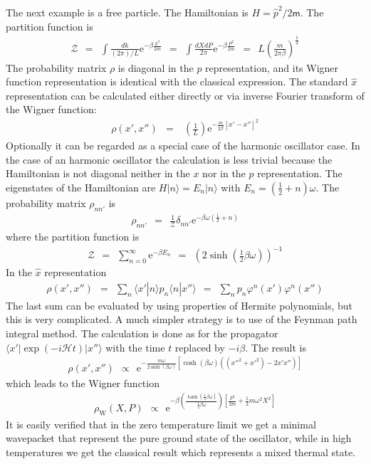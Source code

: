 \documentclass[onecolumn,fleqn]{revtex4}
\newcommand{\eexp}{\mathrm{e}^}
\newcommand{\mass}{\mathsf{m}}
\newcommand{\tbox}[1]{\text{#1}}
\newcommand{\beq}{\begin{eqnarray}}
\newcommand{\eeq}{\end{eqnarray}}
\begin{document}
The next example is a free particle.
The Hamiltonian is $H = \hat{p}^2/2\mass$. 
The partition function is  
\beq
\mathcal{Z} 
\ \ = \ \ \int \frac{dk}{(2\pi)/L} \eexp{-\beta \frac{k^2}{2m}} 
\ \ = \ \ \int \frac{dXdP}{2 \pi} \eexp{-\beta \frac{P^2}{2m}} 
\ \ = \ \ L \left( \frac{m}{2 \pi \beta} \right)^{\frac{1}{2}} 
\eeq
The probability matrix  $\rho$ is diagonal in the $p$ 
representation, and its Wigner function representation 
is identical with the classical expression. 
The standard $\hat{x}$ representation can be calculated either 
directly or via inverse Fourier transform of the Wigner function:
\beq
\rho (x',x'') & = & \ \left( \frac{1}{L} \right)  \eexp{-\frac{m}{2 \beta }[x'-x'']^2}
\eeq
Optionally it can be regarded as a special case of 
the harmonic oscillator case. In the case of an 
harmonic oscillator the calculation is 
less trivial because the Hamiltonian is not diagonal neither 
in the $x$ nor in the $p$ representation. 
The eigenstates of the Hamiltonian are $H |n\rangle = E_n |n\rangle$ 
with $E_n = \left( \frac{1}{2} + n \right) \omega$. 
The probability matrix $\rho_{nn'}$ is 
\beq
\rho_{nn'} \ \ = \ \ \frac{1}{\mathcal{Z}} \delta_{nn'} 
\eexp{-\beta \omega \left( \frac{1}{2} + n \right) } \eeq
where the partition function is 
\beq
\mathcal{Z} \ \ = \ \ \sum_{n=0}^{\infty} \eexp{-\beta E_n} 
\ \ = \ \ \left( 2 \sinh \left( \frac{1}{2} \beta \omega \right) \right)^{-1}
\eeq
In the $\hat{x}$ representation
\beq
\rho (x',x'') 
\ \ = \ \ \sum_n \langle x' | n \rangle p_n \langle n | x'' \rangle  
\ \ = \ \ \sum_n p_n \varphi^ n (x')\varphi^ n (x'') 
\eeq
The last sum can be evaluated by using properties 
of Hermite polynomials, but this is very complicated. 
A much simpler strategy is to use of the Feynman path integral 
method. The calculation is done as for the 
propagator $\langle x' | \exp(-i\mathcal{H} t) | x'' \rangle$
with the time $t$ replaced by $-i\beta$.  
The result is  
\beq
\rho (x',x'')  \ \ \propto \ \   
\eexp{-\frac{m \omega}{2 \sinh (\beta \omega)} 
\left[ \cosh(\beta \omega) \left( ({x''}^2 + {x'}^2)  - 2 x' x'' \right)\right]}
\eeq
which leads to the Wigner function 
\beq
\rho_{\tbox{W}}(X,P)  \ \ \propto  \ \ \eexp{-\beta 
\left( \frac{\tanh \left( \frac{1}{2} \beta \omega \right)}{\frac{1}{2} \beta \omega} \right) 
\left[ \frac{P^2}{2m} + \frac{1}{2} m \omega^2 X^2 \right]}
\eeq
It is easily verified that in the zero temperature 
limit we get a minimal wavepacket that represent the 
pure ground state of the oscillator, while in high 
temperatures we get the classical result which represents 
a mixed thermal state.  
\end{document}
